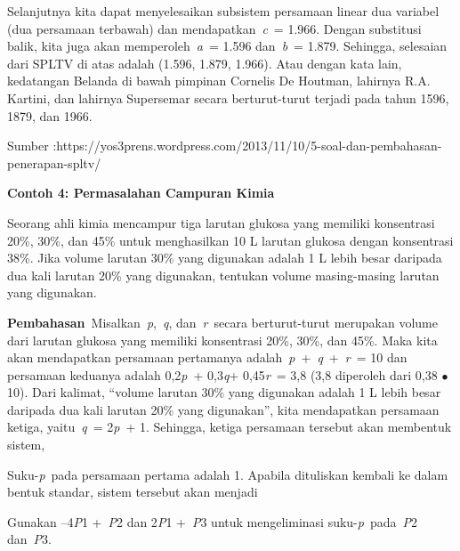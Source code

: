 \documentclass[11pt,fleqn]{book} %
\begin{document}
\begin{myEnumerate}
\begin{itemize}
\noindent 

\noindent Selanjutnya kita dapat menyelesaikan subsistem persamaan linear dua variabel (dua persamaan terbawah) dan mendapatkan~\textit{c}~= 1.966. Dengan substitusi balik, kita juga akan memperoleh~\textit{a}~= 1.596 dan~\textit{b}~= 1.879. Sehingga, selesaian dari SPLTV di atas adalah (1.596, 1.879, 1.966). Atau dengan kata lain, kedatangan Belanda di bawah pimpinan Cornelis De Houtman, lahirnya R.A. Kartini, dan lahirnya Supersemar secara berturut-turut terjadi pada tahun 1596, 1879, dan 1966.

\noindent Sumber :https://yos3prens.wordpress.com/2013/11/10/5-soal-dan-pembahasan-penerapan-spltv/

\noindent 

\noindent \textbf{Contoh 4: Permasalahan Campuran Kimia}

\noindent Seorang ahli kimia mencampur tiga larutan glukosa yang memiliki konsentrasi 20\%, 30\%, dan 45\% untuk menghasilkan 10 L larutan glukosa dengan konsentrasi 38\%. Jika volume larutan 30\% yang digunakan adalah 1 L lebih besar daripada dua kali larutan 20\% yang digunakan, tentukan volume masing-masing larutan yang digunakan.

\noindent 

\noindent \textbf{Pembahasan}~Misalkan~\textit{p},~\textit{q}, dan~\textit{r}~secara berturut-turut merupakan volume dari larutan glukosa yang memiliki konsentrasi 20\%, 30\%, dan 45\%. Maka kita akan mendapatkan persamaan pertamanya adalah~\textit{p}~+~\textit{q}~+~\textit{r}~= 10 dan persamaan keduanya adalah 0,2\textit{p}~+ 0,3\textit{q}+ 0,45\textit{r}~= 3,8 (3,8 diperoleh dari 0,38 $\mathrm{\bullet}$ 10). Dari kalimat, ``volume larutan 30\% yang digunakan adalah 1 L lebih besar daripada dua kali larutan 20\% yang digunakan'', kita mendapatkan persamaan ketiga, yaitu~\textit{q}~= 2\textit{p}~+ 1. Sehingga, ketiga persamaan tersebut akan membentuk sistem,

\noindent 

\noindent Suku-\textit{p}~pada persamaan pertama adalah 1. Apabila dituliskan kembali ke dalam bentuk standar, sistem tersebut akan menjadi

\noindent 

\noindent Gunakan --4\textit{P}1 +~\textit{P}2 dan 2\textit{P}1 +~\textit{P}3 untuk mengeliminasi suku-\textit{p}~pada~\textit{P}2 dan~\textit{P}3.

\noindent

\noindent 


\end{itemize}
\end{myEnumerate}
\end{document}
